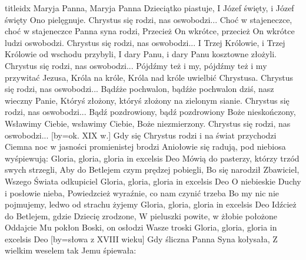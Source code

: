 \documentclass[a5paper, portrait, 12pt]{mwart}
\begin{document}
\begin{songs}{titleidx}
\endchorus
\beginverse
    Maryja Panna, Maryja Panna Dzieciątko piastuje,
    I Józef święty, i Józef święty Ono pielęgnuje.
\endverse
\beginchorus
    Chrystus się rodzi, nas oswobodzi...
\endchorus
\beginverse
    Choć w stajeneczce, choć w stajeneczce Panna syna rodzi,
    Przecież On wkrótce, przecież On wkrótce ludzi oswobodzi.
\endverse
\beginchorus
    Chrystus się rodzi, nas oswobodzi...
\endchorus
\beginverse
    I Trzej Królowie, i Trzej Królowie od wschodu przybyli,
    I dary Panu, i dary Panu kosztowne złożyli.
\endverse
\beginchorus
    Chrystus się rodzi, nas oswobodzi...
\endchorus
\beginverse
    Pójdźmy też i my, pójdźmy też i my przywitać Jezusa,
    Króla na króle, Króla nad króle uwielbić Chrystusa.
\endverse
\beginchorus
    Chrystus się rodzi, nas oswobodzi...
\endchorus
\beginverse
    Bądźże pochwalon, bądźże pochwalon dziś, nasz wieczny Panie,
    Któryś złożony, któryś złożony na zielonym sianie.
\endverse
\beginchorus
    Chrystus się rodzi, nas oswobodzi...
\endchorus
\beginverse
    Bądź pozdrowiony, bądź pozdrowiony Boże nieskończony,
    Wsławimy Ciebie, wsławimy Ciebie, Boże niezmierzony.
\endverse
\beginchorus
    Chrystus się rodzi, nas oswobodzi...
\endchorus
\endsong
[by={ok. XIX w.}]
\beginverse
    Gdy się Chrystus rodzi i na świat przychodzi
    Ciemna noc w jasności promienistej brodzi
    Aniołowie się radują, pod niebiosa wyśpiewują:
\endverse
\beginchorus
        Gloria, gloria, gloria in excelsis Deo
\endchorus
\beginverse
    Mówią do pasterzy, którzy trzód swych strzegli,
    Aby do Betlejem czym prędzej pobiegli,
    Bo się narodził Zbawiciel, Wszego Świata odkupiciel
\endverse
\beginchorus
        Gloria, gloria, gloria in excelsis Deo
\endchorus
\beginverse
    O niebieskie Duchy i posłowie nieba,
    Powiedzcież wyraźnie, co nam czynić trzeba
    Bo my nic nie pojmujemy, ledwo od strachu żyjemy
\endverse
\beginchorus
        Gloria, gloria, gloria in excelsis Deo
\endchorus
\beginverse
    Idźcież do Betlejem, gdzie Dziecię zrodzone,
    W pieluszki powite, w żłobie położone
    Oddajcie Mu pokłon Boski, on osłodzi Wasze troski
\endverse
\beginchorus
        Gloria, gloria, gloria in excelsis Deo
\endchorus
\endsong
[by={słowa z XVIII wieku}]
\beginverse
    Gdy śliczna Panna Syna kołysała,
    Z wielkim weselem tak Jemu śpiewała:


\end{songs}
\end{document}
